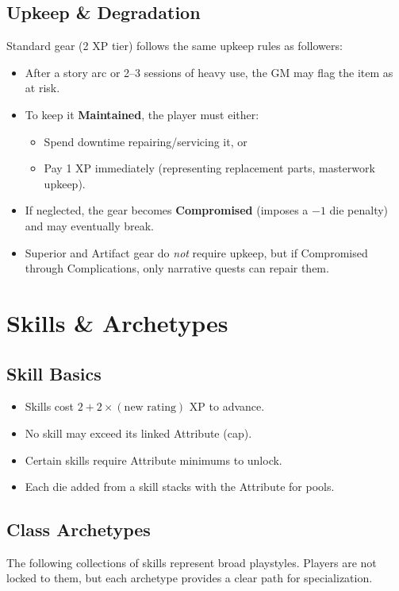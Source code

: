 \documentclass[12pt]{book}
\begin{document}
\subsection*{Upkeep \& Degradation}
Standard gear (2 XP tier) follows the same upkeep rules as followers:
\begin{itemize}
  \item After a story arc or 2--3 sessions of heavy use, the GM may flag the item as at risk.
  \item To keep it \textbf{Maintained}, the player must either:
  \begin{itemize}
    \item Spend downtime repairing/servicing it, or
    \item Pay 1 XP immediately (representing replacement parts, masterwork upkeep).
  \end{itemize}
  \item If neglected, the gear becomes \textbf{Compromised} (imposes a $-1$ die penalty) and may eventually break.
  \item Superior and Artifact gear do \emph{not} require upkeep, but if Compromised through Complications, only narrative quests can repair them.
\end{itemize}

\section{Skills \& Archetypes}

\subsection{Skill Basics}
\begin{itemize}
  \item Skills cost $2 + 2 \times (\text{new rating})$ XP to advance.
  \item No skill may exceed its linked Attribute (cap).
  \item Certain skills require Attribute minimums to unlock.
  \item Each die added from a skill stacks with the Attribute for pools.
\end{itemize}

\subsection{Class Archetypes}
The following collections of skills represent broad playstyles. Players are not locked to them, but each archetype provides a clear path for specialization.
\end{document}
